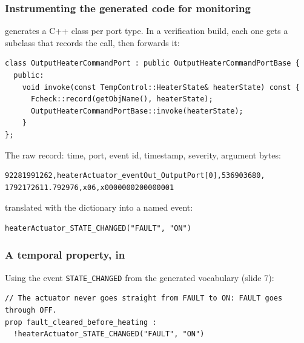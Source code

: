 \begin{frame}[fragile]
  \frametitle{Instrumenting the generated code for monitoring} \small
{}

\vspace{-0.2cm}
\fprime{} generates a C++ class per port type. In a verification build, each one gets a
subclass that records the call, then forwards it:

\vspace{0.1cm}
\begin{lstlisting}[style=cpp]
class OutputHeaterCommandPort : public OutputHeaterCommandPortBase {
  public:
    void invoke(const TempControl::HeaterState& heaterState) const {
      Fcheck::record(getObjName(), heaterState);
      OutputHeaterCommandPortBase::invoke(heaterState);
    }
};
\end{lstlisting}

\pause
\vspace{0.25cm}
The raw record: time, port, event id, timestamp, severity, argument bytes:

\vspace{0.1cm}
\begin{lstlisting}[style=shell]
92281991262,heaterActuator_eventOut_OutputPort[0],536903680,
1792172611.792976,x06,x0000000200000001
\end{lstlisting}

\pause
\vspace{0.25cm}
translated with the \fprime{} dictionary into a named event:

\vspace{0.1cm}
\begin{lstlisting}[language=qtl]
heaterActuator_STATE_CHANGED("FAULT", "ON")
\end{lstlisting}

\end{frame}

\begin{frame}[fragile]
  \frametitle{A temporal property, in \dejavumt{}} \small
{}

\vspace{0.3cm}
Using the event {\tt STATE\_CHANGED} from the generated vocabulary (slide 7):

\vspace{0.3cm}
\begin{lstlisting}[language=qtl]
// The actuator never goes straight from FAULT to ON: FAULT goes through OFF.
prop fault_cleared_before_heating :
  !heaterActuator_STATE_CHANGED("FAULT", "ON")
\end{lstlisting}

\end{frame}

